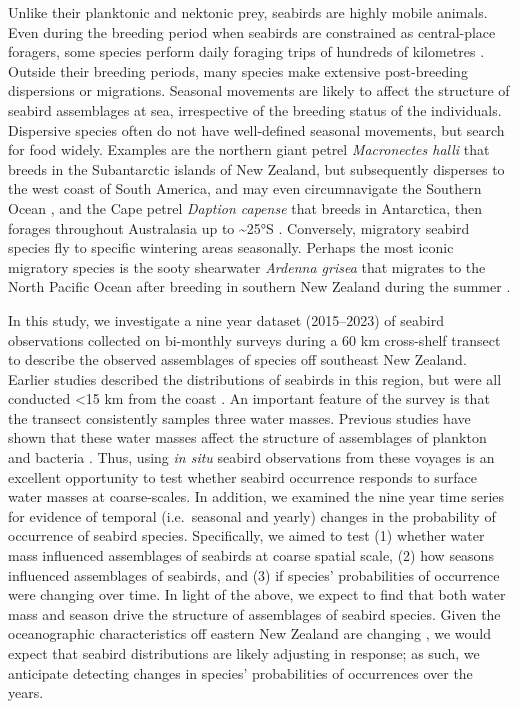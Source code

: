 \documentclass[preprint, 3p, authoryear]{elsarticle} %
\begin{document}
Unlike their planktonic and nektonic prey, seabirds are highly mobile animals. Even during the breeding period when seabirds are constrained as central-place foragers, some species perform daily foraging trips of hundreds of kilometres \citep{mcduie2015, patterson2022}. Outside their breeding periods, many species make extensive post-breeding dispersions or migrations. Seasonal movements are likely to affect the structure of seabird assemblages at sea, irrespective of the breeding status of the individuals. Dispersive species often do not have well-defined seasonal movements, but search for food widely. Examples are the northern giant petrel \emph{Macronectes halli} that breeds in the Subantarctic islands of New Zealand, but subsequently disperses to the west coast of South America, and may even circumnavigate the Southern Ocean \citep{woehler1988, quinones2021}, and the Cape petrel \emph{Daption capense} that breeds in Antarctica, then forages throughout Australasia up to \textasciitilde25°S \citep{hanzab2023}. Conversely, migratory seabird species fly to specific wintering areas seasonally. Perhaps the most iconic migratory species is the sooty shearwater \emph{Ardenna grisea} that migrates to the North Pacific Ocean after breeding in southern New Zealand during the summer \citep{shaffer2006}.

In this study, we investigate a nine year dataset (2015--2023) of seabird observations collected on bi-monthly surveys during a 60 km cross-shelf transect to describe the observed assemblages of species off southeast New Zealand. Earlier studies described the distributions of seabirds in this region, but were all conducted \textless15 km from the coast \citep{mcclatchie1989, hawke1991, odriscoll1998a, odriscoll1998b, bourke2024}. An important feature of the survey is that the transect consistently samples three water masses. Previous studies have shown that these water masses affect the structure of assemblages of plankton and bacteria \citep{baltar2016, jones2013, adams2023}. Thus, using \emph{in situ} seabird observations from these voyages is an excellent opportunity to test whether seabird occurrence responds to surface water masses at coarse-scales. In addition, we examined the nine year time series for evidence of temporal (i.e.~seasonal and yearly) changes in the probability of occurrence of seabird species. Specifically, we aimed to test (1) whether water mass influenced assemblages of seabirds at coarse spatial scale, (2) how seasons influenced assemblages of seabirds, and (3) if species' probabilities of occurrence were changing over time. In light of the above, we expect to find that both water mass and season drive the structure of assemblages of seabird species. Given the oceanographic characteristics off eastern New Zealand are changing \citep{sutton2024}, we would expect that seabird distributions are likely adjusting in response; as such, we anticipate detecting changes in species' probabilities of occurrences over the years.
\end{document}
